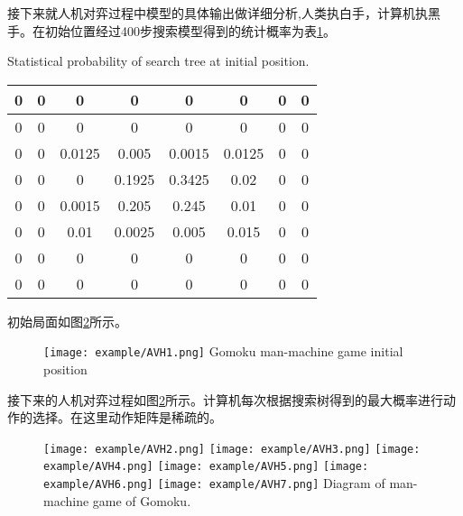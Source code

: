接下来就人机对弈过程中模型的具体输出做详细分析,人类执白手，计算机执黑手。在初始位置经过400步搜索模型得到的统计概率为表\ref{tab:moxinggailv2}。
\begin{table}[htbp]
	\centering
	{Statistical probability of search tree at initial position.}
	\label{tab:moxinggailv2}
\begin{tabular}{|c|c|c|c|c|c|c|c|}
	\hline 
	0& 0 & 0 & 0 & 0 & 0 &  0&  0\\ 
	\hline 
	0& 0 & 0 & 0 & 0 & 0 &  0&  0\\ 
	\hline 
	0 & 0 & 0.0125 & 0.005 & 0.0015 & 0.0125 & 0 & 0 \\ 
	\hline 
	0 & 0 & 0 & 0.1925 & 0.3425 & 0.02 & 0 & 0 \\ 
	\hline 
	0 & 0 & 0.0015 & 0.205 & 0.245 & 0.01 & 0 & 0 \\ 
	\hline 
	0 & 0 & 0.01 & 0.0025 & 0.005 & 0.015 & 0 & 0 \\ 
	\hline 
	0 & 0 & 0 & 0 & 0 & 0 & 0 & 0 \\ 
	\hline 
	0 & 0 & 0 & 0 & 0 & 0 & 0 & 0 \\  
	\hline 
\end{tabular} 
\end{table}
初始局面如图\ref{fig:AIvsHuman}所示。

\begin{figure}[htbp]
	\centering
	\texttt{[image: example/AVH1.png]}
	\hspace{0.5cm}
	{Gomoku man-machine game initial position}
	\label{figAIvsHuman}
\end{figure}

接下来的人机对弈过程如图\ref{fig:AIvsHuman}所示。计算机每次根据搜索树得到的最大概率进行动作的选择。在这里动作矩阵是稀疏的。

\begin{figure}[hbtp]
	\centering
	\texttt{[image: example/AVH2.png]}
	\hspace{0.5cm}
	\texttt{[image: example/AVH3.png]}
	\hspace{0.5cm}
	\texttt{[image: example/AVH4.png]}
	\hspace{0.5cm}
	\texttt{[image: example/AVH5.png]}
	\hspace{0.5cm}
	\texttt{[image: example/AVH6.png]}
	\hspace{0.5cm}
	\texttt{[image: example/AVH7.png]}
	{Diagram of man-machine game of Gomoku.}
	\label{fig:AIvsHuman}
\end{figure}


